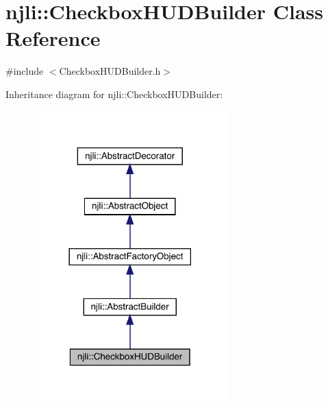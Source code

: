 \hypertarget{classnjli_1_1_checkbox_h_u_d_builder}{}\section{njli\+:\+:Checkbox\+H\+U\+D\+Builder Class Reference}
\label{classnjli_1_1_checkbox_h_u_d_builder}


{\ttfamily \#include $<$Checkbox\+H\+U\+D\+Builder.\+h$>$}



Inheritance diagram for njli\+:\+:Checkbox\+H\+U\+D\+Builder\+:\nopagebreak
\begin{figure}[H]
\begin{center}
\leavevmode
\includegraphics[width=213pt]{classnjli_1_1_checkbox_h_u_d_builder__inherit__graph}
\end{center}
\end{figure}


